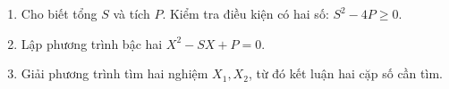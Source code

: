 \begin{enumerate}
\item Cho biết tổng $S$ và tích $P$. Kiểm tra điều kiện có hai số: $S^2 - 4P \ge 0$.
\item Lập phương trình bậc hai $X^2 - SX + P = 0$.
\item Giải phương trình tìm hai nghiệm $X_1, X_2$, từ đó kết luận hai cặp số cần tìm.
\end{enumerate}
